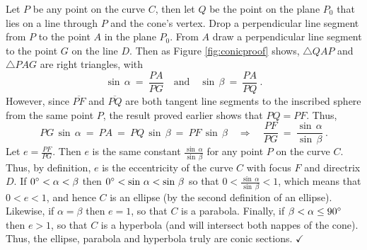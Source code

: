 Let $P$ be any point on the curve $C$, then let
$Q$ be the point on the plane $P_0$ that lies on a line through $P$ and the
cone's vertex. Drop a perpendicular line segment from $P$ to the point $A$ in
the plane $P_0$. From $A$ draw a perpendicular line segment to the point $G$ on
the line $D$. Then as Figure \ref{fig:conicproof} shows, $\triangle QAP$ and
$\triangle PAG$ are right triangles, with
\[
\sin\,\alpha ~=~ \frac{PA}{PG} \quad\text{and}\quad
\sin\,\beta ~=~ \frac{PA}{PQ} ~.
\]
However, since $\overline{PF}$ and $\overline{PQ}$ are both tangent line
segments to the inscribed sphere from the same point $P$, the result proved
earlier shows that $PQ = PF$. Thus,
\[
PG\,\sin\,\alpha ~=~ PA ~=~ PQ\,\sin\,\beta ~=~ PF\,\sin\,\beta
\quad\Rightarrow\quad \frac{PF}{PG} ~=~ \frac{\sin\,\alpha}{\sin\,\beta} ~.
\]
Let $e = \frac{PF}{PG}$. Then $e$ is the same constant
$\frac{\sin\,\alpha}{\sin\,\beta}$ for any point $P$ on the curve $C$. Thus, by
definition, $e$ is the eccentricity of the curve $C$ with focus $F$ and
directrix $D$. If $0^\circ < \alpha < \beta$ then $0^\circ <
\sin\,\alpha < \sin\,\beta$ so that $0 < \frac{\sin\,\alpha}{\sin\,\beta} < 1$,
which means that $0 < e < 1$, and hence $C$ is an ellipse (by the second
definition of an ellipse). Likewise, if $\alpha = \beta$ then $e=1$, so that $C$
is a parabola. Finally, if $\beta < \alpha \le 90^\circ$ then $e > 1$, so that
$C$ is a hyperbola (and will intersect both nappes of the cone). Thus, the
ellipse, parabola and hyperbola truly are conic sections. $\checkmark$
\newpage
\startexercises\label{sec7dot3}
